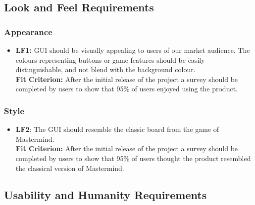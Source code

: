 \documentclass[12pt, titlepage]{article}
\begin{document}
\subsection{Look and Feel Requirements}
\subsubsection{Appearance}
\begin{itemize}
\item \textbf{LF1:} GUI should be visually appealing to users of our market audience. The colours representing buttons or game features should be easily distinguishable, and not blend with the background colour.\\
\textbf{Fit Criterion:} After the initial release of the project a survey should be completed by users to show that 95\% of users enjoyed using the product.
\end{itemize}

\subsubsection{Style}
\begin{itemize}
\item \textbf{LF2}: The GUI should resemble the classic board from the game of Mastermind.\\
\textbf{Fit Criterion:} After the initial release of the project a survey should be completed by users to show that 95\% of users thought the product resembled the classical version of Mastermind.
\end{itemize}

\subsection{Usability and Humanity Requirements}
\end{document}
